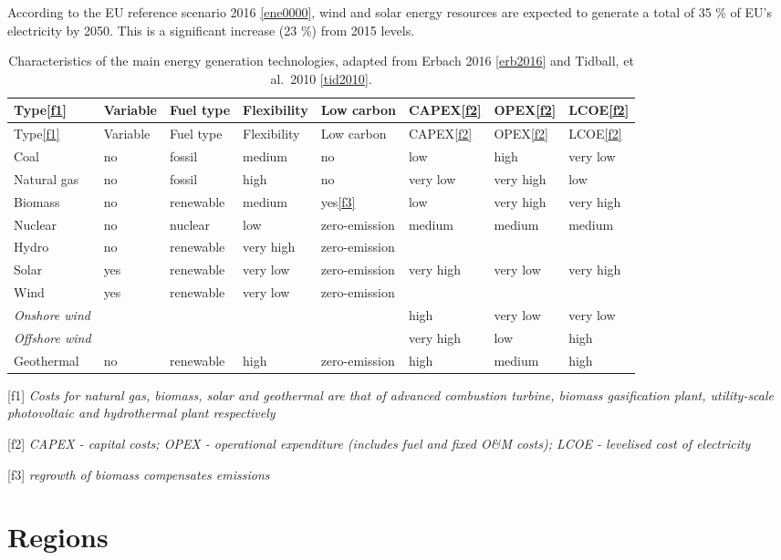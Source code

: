 According to the EU reference scenario 2016
\protect\hyperlink{ene0000}{{[}ene0000{]}}, wind and solar energy
resources are expected to generate a total of 35 \% of EU's electricity
by 2050. This is a significant increase (23 \%) from 2015 levels.

\begin{longtable}[]{@{}llllllll@{}}
\caption{Characteristics of the main energy generation technologies,
adapted from Erbach 2016 \protect\hyperlink{erb2016}{{[}erb2016{]}} and
Tidball, et al.~2010
\protect\hyperlink{tid2010}{{[}tid2010{]}}.}\tabularnewline
\toprule
Type\protect\hyperlink{f1}{{[}f1{]}} & Variable & Fuel type &
Flexibility & Low carbon & CAPEX\protect\hyperlink{f2}{{[}f2{]}} &
OPEX\protect\hyperlink{f2}{{[}f2{]}} &
LCOE\protect\hyperlink{f2}{{[}f2{]}}\tabularnewline
\midrule
\endfirsthead
\toprule
Type\protect\hyperlink{f1}{{[}f1{]}} & Variable & Fuel type &
Flexibility & Low carbon & CAPEX\protect\hyperlink{f2}{{[}f2{]}} &
OPEX\protect\hyperlink{f2}{{[}f2{]}} &
LCOE\protect\hyperlink{f2}{{[}f2{]}}\tabularnewline
\midrule
\endhead
Coal & no & fossil & medium & no & low & high & very low\tabularnewline
Natural gas & no & fossil & high & no & very low & very high &
low\tabularnewline
Biomass & no & renewable & medium & yes\protect\hyperlink{f3}{{[}f3{]}}
& low & very high & very high\tabularnewline
Nuclear & no & nuclear & low & zero-emission & medium & medium &
medium\tabularnewline
Hydro & no & renewable & very high & zero-emission & & &\tabularnewline
Solar & yes & renewable & very low & zero-emission & very high & very
low & very high\tabularnewline
Wind & yes & renewable & very low & zero-emission & & &\tabularnewline
\emph{Onshore wind} & & & & & high & very low & very low\tabularnewline
\emph{Offshore wind} & & & & & very high & low & high\tabularnewline
Geothermal & no & renewable & high & zero-emission & high & medium &
high\tabularnewline
\bottomrule
\end{longtable}

{[}f1{]} \emph{Costs for natural gas, biomass, solar and geothermal are
that of advanced combustion turbine, biomass gasification plant,
utility-scale photovoltaic and hydrothermal plant respectively}

{[}f2{]} \emph{CAPEX - capital costs; OPEX - operational expenditure
(includes fuel and fixed O\&M costs); LCOE - levelised cost of
electricity}

{[}f3{]} \emph{regrowth of biomass compensates emissions}

\hypertarget{regions}{%
\section{Regions}\label{regions}}

